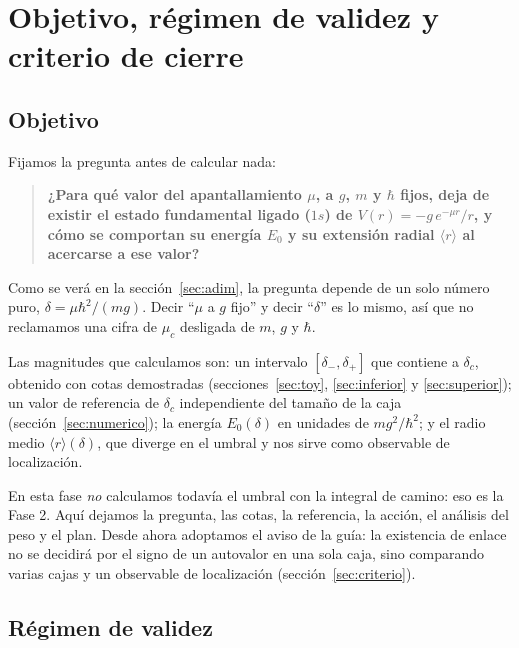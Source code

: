 \documentclass[11pt]{article}
\newcommand{\dc}{\delta_c}
\begin{document}
\section{Objetivo, régimen de validez y criterio de cierre}
\label{sec:marco}

\subsection{Objetivo}

Fijamos la pregunta antes de calcular nada:

\begin{quote}
\textbf{¿Para qué valor del apantallamiento $\mu$, a $g$, $m$ y $\hbar$ fijos, deja de existir el estado fundamental ligado ($1s$) de $V(r)=-g\,e^{-\mu r}/r$, y cómo se comportan su energía $E_0$ y su extensión radial $\langle r\rangle$ al acercarse a ese valor?}
\end{quote}

Como se verá en la sección~\ref{sec:adim}, la pregunta depende de un solo número puro, $\delta=\mu\hbar^2/(mg)$. Decir ``$\mu$ a $g$ fijo'' y decir ``$\delta$'' es lo mismo, así que no reclamamos una cifra de $\mu_c$ desligada de $m$, $g$ y $\hbar$.

Las magnitudes que calculamos son: un intervalo $[\delta_-,\delta_+]$ que contiene a $\dc$, obtenido con cotas demostradas (secciones~\ref{sec:toy}, \ref{sec:inferior} y \ref{sec:superior}); un valor de referencia de $\dc$ independiente del tamaño de la caja (sección~\ref{sec:numerico}); la energía $E_0(\delta)$ en unidades de $mg^2/\hbar^2$; y el radio medio $\langle r\rangle(\delta)$, que diverge en el umbral y nos sirve como observable de localización.

En esta fase \emph{no} calculamos todavía el umbral con la integral de camino: eso es la Fase 2. Aquí dejamos la pregunta, las cotas, la referencia, la acción, el análisis del peso y el plan. Desde ahora adoptamos el aviso de la guía: la existencia de enlace no se decidirá por el signo de un autovalor en una sola caja, sino comparando varias cajas y un observable de localización (sección~\ref{sec:criterio}).

\subsection{Régimen de validez}
\end{document}
